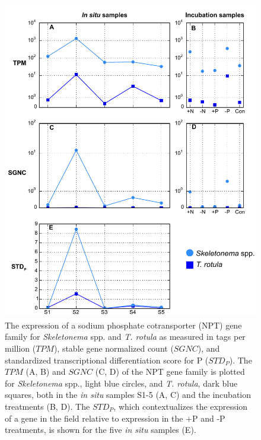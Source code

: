 \begin{figure}[p!]
  \centering
    \includegraphics[width=.8\textwidth]{Images/C3_STDP_Steps_NaPi.pdf}
    \caption[Expression of sodium phosphate cotransporter as measured in $TPM$, $SGNC$, and $STD_P$]{The expression of a sodium phosphate cotransporter (NPT) gene family for \textit{Skeletonema} spp. and \textit{T. rotula} as measured in tags per million ($TPM$), stable gene normalized count ($SGNC$), and standardized transcriptional differentiation score for P ($STD_P$). The $TPM$ (A, B) and $SGNC$ (C, D) of the NPT gene family is plotted for \textit{Skeletonema} spp., light blue circles, and \textit{T. rotula}, dark blue squares, both in the \textit{in situ} samples S1-5 (A, C) and the incubation treatments (B, D). The $STD_P$, which contextualizes the expression of a gene in the field relative to expression in the +P and -P treatments, is shown for the five \textit{in situ} samples (E).} 
  \label{fig:a3f8}
\end{figure}


